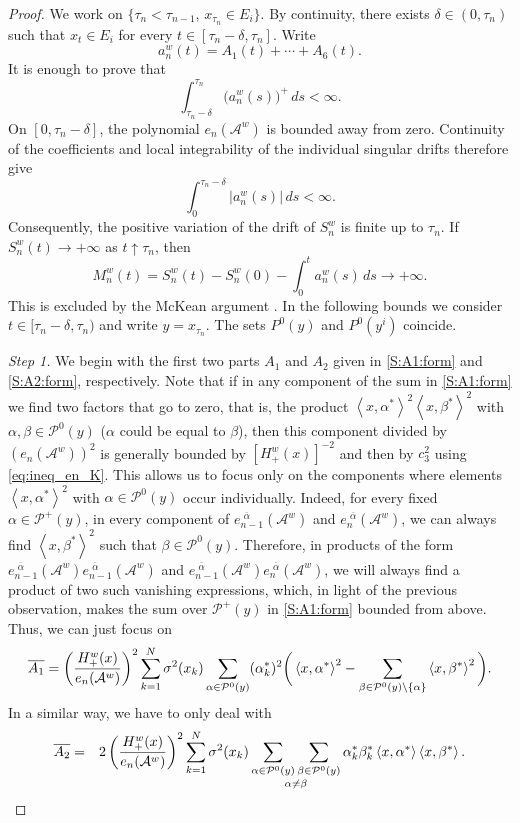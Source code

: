 \documentclass{article}
\numberwithin{equation}{section}
\newcommand{\Aa}{\mathcal{A}^{w}}
\newcommand{\xas}{\left<x,\alpha^*\right>}
\newcommand{\xbs}{\left<x,\beta^*\right>}
\newcommand{\SaPz}{\sum_{\alpha\in\Pzero}}
\newcommand{\SbPzna}{\sum_{\beta\in\Pzero\backslash\{\alpha\}}}
\newcommand{\shift}{\,\,}
\newcommand{\eA}[1]{e_{#1}(\Aa)}
\newcommand{\eaA}[1]{e_{#1}^{\shift\overline{\alpha}}(\Aa)}
\newcommand{\Pzero}{\mathcal{P}^0(y)}
\newcommand{\Pplus}{\mathcal{P}^+(y)}
\theoremstyle{plain}
\begin{document}
\begin{proof}
\medskip 

We work on
$\{\tau_n<\tau_{n-1},\,x_{\tau_n}\in E_i\}$. By continuity, there exists $\delta\in(0,\tau_n)$ such that $x_t\in E_i$ for every $t\in[\tau_n-\delta,\tau_n]$. Write
    \begin{equation*}
        a_n^w(t)=A_1(t)+\cdots+A_6(t).
    \end{equation*}
It is enough to prove that
    \begin{equation*}
        \int_{\tau_n-\delta}^{\tau_n} \bigl(a_n^w(s)\bigr)^+\,ds<\infty.
    \end{equation*}
On $[0,\tau_n-\delta]$, the polynomial $\eA{n}$ is bounded away from zero. Continuity of the coefficients and local integrability of the individual singular drifts therefore give
    \begin{equation*}
        \int_0^{\tau_n-\delta}|a_n^w(s)|\,ds<\infty.
    \end{equation*}
Consequently, the positive variation of the drift of $S_n^w$ is finite up to $\tau_n$. If $S_n^w(t)\to+\infty$ as $t\uparrow\tau_n$, then
    \begin{equation*}
        M_n^w(t) =S_n^w(t)-S_n^w(0)-\int_0^t a_n^w(s)\,ds \longrightarrow+\infty.
    \end{equation*}
This is excluded by the McKean argument \cite[Problem 7, p.~47]{McKean}. In the following bounds we consider $t\in[\tau_n-\delta,\tau_n)$ and write $y=x_{\tau_n}$. The sets $P^0(y)$ and $P^0(y^i)$ coincide.

\bigskip


{\it Step 1.} We begin with the first two parts $A_1$ and $A_2$ given in \eqref{S:A1:form} and \eqref{S:A2:form}, respectively. Note that if in any component of the sum in \eqref{S:A1:form} we find two factors that go to zero, that is, the product $\xas^2\xbs^2$ with $\alpha,\beta\in \Pzero$ ($\alpha$ could be equal to $\beta$),
then this component divided by $(\eA{n})^2$ is generally bounded by $[H^w_+(x)]^{-2}$ and then by $c_3^2$ using \eqref{eq:ineq_en_K}.
This allows us to focus only on the components where elements $\xas^2$ with $\alpha\in\Pzero$ occur individually. Indeed, for every fixed $\alpha\in \Pplus$, in every component of $\eaA{n-1}$ and $\eaA{n}$, we can always find $\xbs^2$ such that $\beta\in \Pzero$. Therefore, in products of the form $\eaA{n-1}\eaA{n-1}$ and $\eaA{n-1}\eaA{n}$, we will always find a product of two such vanishing expressions, which, in light of the previous observation, makes the sum over $\Pplus$ in \eqref{S:A1:form} bounded from above. Thus, we can just focus on
    \begin{equation*}
        \overline{A_1} = \left(\frac{H^w_+(x)}{\eA{n}}\right)^2 \sum_{k=1}^N \sigma^2(x_k)\SaPz(\alpha_k^*)^2   \bigg(\xas^2-\SbPzna\xbs^2\bigg)\/.
    \end{equation*}
In a similar way, we have to only deal with
\begin{eqnarray*}
	\overline{A_2} &=& 2\left(\frac{H^w_+(x)}{\eA{n}}\right)^2\sum_{k=1}^N \sigma^2(x_k)\mathop{\sum_{\alpha\in\Pzero}\sum_{\beta\in\Pzero}}_{\alpha\neq \beta} \alpha_k^*\beta_k^* \xas\xbs \/.
\end{eqnarray*}


\end{proof}
\end{document}
